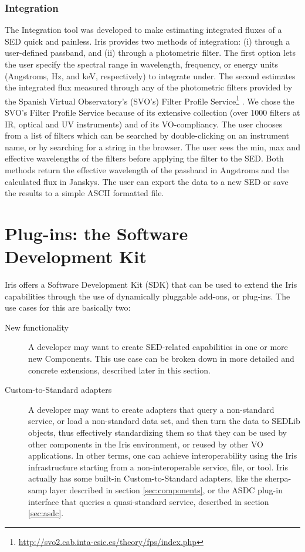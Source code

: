 \documentclass[final,5p]{elsarticle}
\begin{document}
\subsubsection{Integration}
The Integration tool was developed to make estimating integrated fluxes of a SED quick and painless. Iris provides two methods of integration: (i) through a user-defined passband, and (ii) through a photometric filter. The first option lets the user specify the spectral range in wavelength, frequency, or energy units (Angstroms, Hz, and keV, respectively) to integrate under. The second estimates the integrated flux measured through any of the photometric filters provided by the Spanish Virtual Observatory's (SVO's) Filter Profile Service\footnote{\url{http://svo2.cab.inta-csic.es/theory/fps/index.php}} \citep{2013arXiv1312.3249S}. We chose the SVO's Filter Profile Service because of its extensive collection (over 1000 filters at IR, optical and UV instruments) and of its VO-compliancy. The user chooses from a list of filters which can be searched by double-clicking on an instrument name, or by searching for a string in the browser. The user sees the min, max and effective wavelengths of the filters before applying the filter to the SED.
Both methods return the effective wavelength of the passband in Angstroms and the calculated flux in Janskys. The user can export the data to a new SED or save the results to a simple ASCII formatted file.

\section{Plug-ins: the Software Development Kit}
\label{sec:plugins}

Iris offers a Software Development Kit (SDK) that can be used to extend the Iris capabilities through the use of dynamically pluggable add-ons, or plug-ins.
The use cases for this are basically two:
\begin{description}
\item[New functionality] A developer may want to create SED-related capabilities in one or more new Components. This use case can be broken down in more detailed and concrete extensions, described later in this section.
\item[Custom-to-Standard adapters] A developer may want to create adapters that query a non-standard service, or load a non-standard data set, and then turn the data to SEDLib objects, thus effectively standardizing them so that they can be used by other components in the Iris environment, or reused by other VO applications. In other terms, one can achieve interoperability using the Iris infrastructure starting from a non-interoperable service, file, or tool. Iris actually has some built-in Custom-to-Standard adapters, like the sherpa-samp layer described in section \ref{sec:components}, or the ASDC plug-in interface that queries a quasi-standard service, described in section \ref{sec:asdc}.
\end{description}
\end{document}
